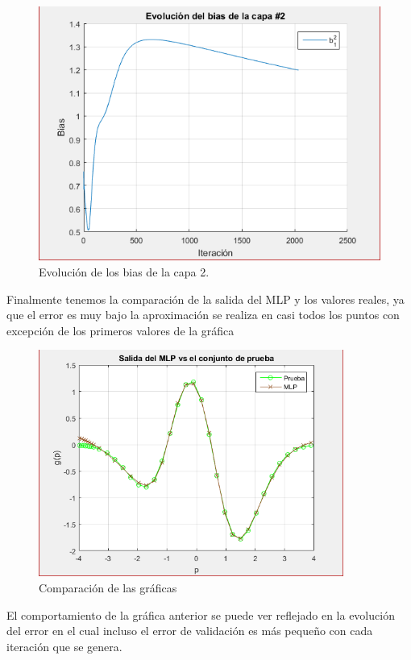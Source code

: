 \begin{figure}[H]
    \begin{center}
        \includegraphics[width=13cm]{2/bias2.png}
        \caption{Evolución de los bias de la capa 2.}
        \label{fig:bias4}
    \end{center}
\end{figure}
Finalmente tenemos la comparación de la salida del MLP y los valores reales, ya que el error es muy bajo la aproximación se realiza en casi todos los puntos con excepción de los primeros valores de la gráfica
\begin{figure}[H]
    \begin{center}
        \includegraphics[width=10cm]{2/prueba.png}
        \caption{Comparación de las gráficas}
        \label{fig:prueba2}
    \end{center}
\end{figure}
El comportamiento de la gráfica anterior se puede ver reflejado en la evolución del error en el cual incluso el error de validación es más pequeño con cada iteración que se genera.
